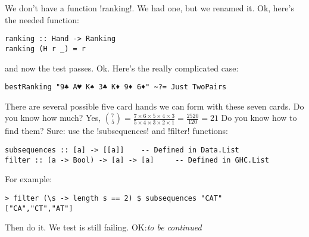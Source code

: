 We don't have a function \il!ranking!. We had one, but we renamed it.
\lhA Ok, here's the needed function:
\begin{lstlisting}[frame=single]
ranking :: Hand -> Ranking
ranking (H r _) = r
\end{lstlisting}
\success and now the test passes.
\lhN Ok. Here's the really complicated case:
\begin{lstlisting}[frame=single]
bestRanking "9♣ A♥ K♠ 3♣ K♦ 9♦ 6♦" ~?= Just TwoPairs
\end{lstlisting}
There are several possible five card hands we can form with these seven cards. Do you know how much?
\lhA Yes, ${{7}\choose{5}} = \frac{7\times6 \times 5 \times 4 \times 3}{5 \times 4 \times 3 \times 2 \times 1} = \frac{2520}{120} = 21$
\lhN Do you know how to find them?
\lhA Sure: use the \il!subsequences! and \il!filter! functions:
\begin{lstlisting}[frame=single]
subsequences :: [a] -> [[a]] 	-- Defined in Data.List
filter :: (a -> Bool) -> [a] -> [a] 	-- Defined in GHC.List
\end{lstlisting}
For example: 
\begin{lstlisting}[frame=single]
> filter (\s -> length s == 2) $ subsequences "CAT"
["CA","CT","AT"]
\end{lstlisting} %
\lhN Then do it. We test is still failing.
\lhA OK:\emph{to be continued}


\lhend

